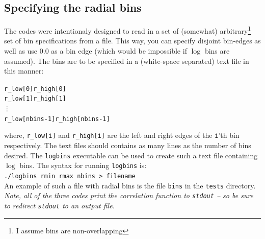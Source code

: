 \documentclass[12pt,titlepage]{article}
\begin{document}
\subsection{Specifying the radial bins}\label{section:bins}
The codes were intentionaly designed to read in a set of (somewhat) arbitrary\footnote{I assume bins are non-overlapping} set of bin specifications from a file. This way, you can specify disjoint bin-edges as well as 
use $0.0$ as a bin edge (which would be impossible if $\log$ bins are assumed). The bins are to be specified in a (white-space separated) text file in this manner:
\begin{alltt}
r\_low[0]  r\_high[0]
r\_low[1]  r\_high[1]
\vdots
r\_low[nbins-1]  r\_high[nbins-1]
\end{alltt}
where, \texttt{r\_low[i]} and \texttt{r\_high[i]} are the left and right edges of the \texttt{i}'th bin respectively. The text files should contains as many lines as the number of 
bins desired. The \texttt{logbins} executable can be used to create such a text file containing $\log$ bins. The syntax for running \texttt{logbins} is:\\
\vspace{0.2in}
\texttt{./logbins rmin rmax nbins   > filename}
\vspace{0.2in}
\\An example of such a file with radial bins is the file \texttt{bins} in the \texttt{tests} directory. 
{\em Note, all of the three codes print the correlation function to \texttt{stdout} -- so be sure to redirect \texttt{stdout} to an output file. }
\end{document}
